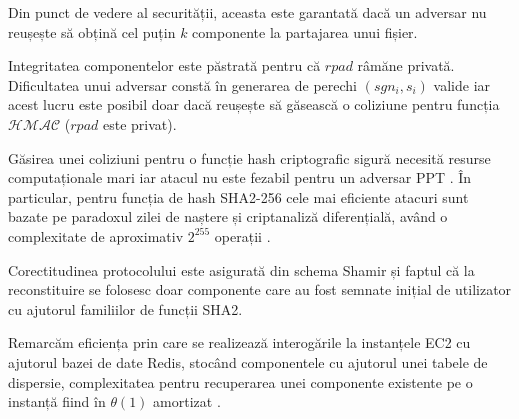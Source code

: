 \documentclass[oneside, 12pt]{book}
\begin{document}
Din punct de vedere al securității, aceasta este garantată dacă un adversar nu reușește să obțină cel puțin $k$ componente la partajarea unui fișier.

Integritatea componentelor este păstrată pentru că $rpad$ râmăne privată. Dificultatea unui adversar constă în generarea de perechi $(sgn_i, s_i)$ valide iar acest lucru este posibil doar dacă reușește să găsească o coliziune pentru funcția $\mathcal{HMAC}$ ($rpad$ este privat).

Găsirea unei coliziuni pentru o funcție hash criptografic sigură necesită resurse computaționale mari iar atacul nu este fezabil pentru un adversar PPT \cite{Katz:2007}. În particular, pentru funcția de hash SHA2-256 cele mai eficiente atacuri sunt bazate pe paradoxul zilei de naștere și criptanaliză diferențială, având o complexitate de aproximativ $2^{255}$ operații \cite{khovratovich2012bicliques}.

Corectitudinea protocolului este asigurată din schema Shamir și faptul că la reconstituire se folosesc doar componente care au fost semnate inițial de utilizator cu ajutorul familiilor de funcții SHA2.

Remarcăm eficiența prin care se realizează interogările la instanțele EC2 cu ajutorul bazei de date Redis, stocând componentele cu ajutorul unei tabele de dispersie, complexitatea pentru recuperarea unei componente existente pe o instanță fiind în $\theta(1)$ amortizat \cite{cormen:2009introduction}.




\end{document}

